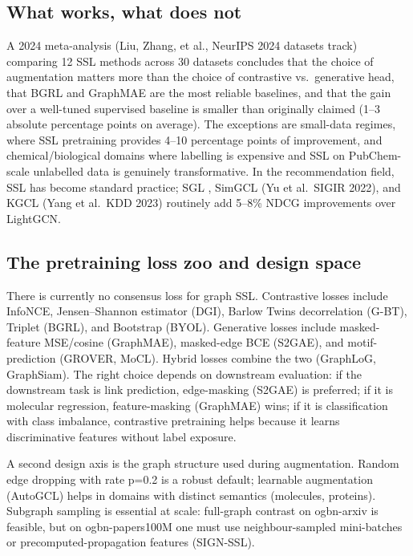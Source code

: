 \documentclass{article}
\begin{document}
\subsection{What works, what does not}\label{what-works-what-does-not}

A 2024 meta-analysis (Liu, Zhang, et al., NeurIPS 2024 datasets track) comparing 12 SSL methods across 30 datasets concludes that the choice of augmentation matters more than the choice of contrastive vs.~generative head, that BGRL and GraphMAE are the most reliable baselines, and that the gain over a well-tuned supervised baseline is smaller than originally claimed (1--3 absolute percentage points on average). The exceptions are small-data regimes, where SSL pretraining provides 4--10 percentage points of improvement, and chemical/biological domains where labelling is expensive and SSL on PubChem-scale unlabelled data is genuinely transformative. In the recommendation field, SSL has become standard practice; SGL \citep{wu2020graphneuralnetwork}, SimGCL (Yu et al.~SIGIR 2022), and KGCL (Yang et al.~KDD 2023) routinely add 5--8\% NDCG improvements over LightGCN.

\subsection{The pretraining loss zoo and design space}\label{the-pretraining-loss-zoo-and-design-space}

There is currently no consensus loss for graph SSL. Contrastive losses include InfoNCE, Jensen--Shannon estimator (DGI), Barlow Twins decorrelation (G-BT), Triplet (BGRL), and Bootstrap (BYOL). Generative losses include masked-feature MSE/cosine (GraphMAE), masked-edge BCE (S2GAE), and motif-prediction (GROVER, MoCL). Hybrid losses combine the two (GraphLoG, GraphSiam). The right choice depends on downstream evaluation: if the downstream task is link prediction, edge-masking (S2GAE) is preferred; if it is molecular regression, feature-masking (GraphMAE) wins; if it is classification with class imbalance, contrastive pretraining helps because it learns discriminative features without label exposure.

A second design axis is the graph structure used during augmentation. Random edge dropping with rate p=0.2 is a robust default; learnable augmentation (AutoGCL) helps in domains with distinct semantics (molecules, proteins). Subgraph sampling is essential at scale: full-graph contrast on ogbn-arxiv is feasible, but on ogbn-papers100M one must use neighbour-sampled mini-batches or precomputed-propagation features (SIGN-SSL).
\end{document}
